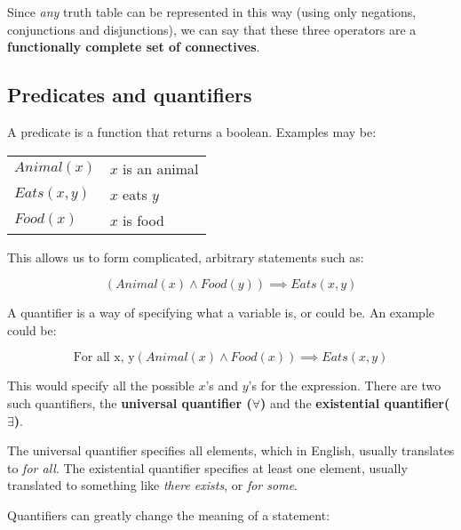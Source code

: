 Since {\it any} truth table can be represented in this way (using only
negations, conjunctions and disjunctions), we can say that these three operators
are a {\bf functionally complete set of connectives}.


\subsection{Predicates and quantifiers}

A predicate is a function that returns a boolean. Examples may be:

\begin{center}
	\begin{tabular}{l l}
		$Animal(x)$ & $x$ is an animal\\
		$Eats(x, y)$ & $x$ eats $y$\\
		$Food(x)$ & $x$ is food\\
	\end{tabular}
\end{center}

This allows us to form complicated, arbitrary statements such as:

\begin{dmath}
	{\left(Animal(x) \wedge Food(y)\right) \implies Eats(x, y)}
\end{dmath}

A quantifier is a way of specifying what a variable is, or could be. An example
could be:

\begin{dmath}
	{\textrm{For all x, y} \left(Animal(x) \wedge Food(x)\right) \implies Eats(x, y)}
\end{dmath}

This would specify all the possible $x$'s and $y$'s for the expression. There
are two such quantifiers, the {\bf universal quantifier ($\forall$)} and the
{\bf existential quantifier($\exists$)}.

The universal quantifier specifies all elements, which in English, usually
translates to {\it for all}. The existential quantifier specifies at least one
element, usually translated to something like {\it there exists}, or {\it for
some}.

Quantifiers can greatly change the meaning of a statement:

